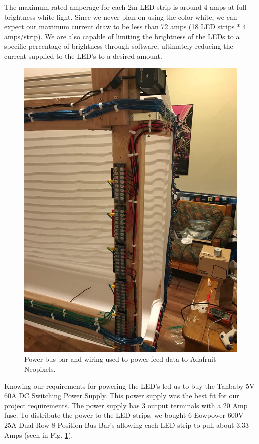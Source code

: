 \documentclass[11pt]{IEEEtran}
\begin{document}
The maximum rated amperage for each 2m LED strip is around 4 amps at full brightness white light. Since we never plan on using the color white, we can expect our maximum current draw to be less than 72 amps (18 LED strips * 4 amps/strip). We are also capable of limiting the brightness of the LEDs to a specific percentage of brightness through software, ultimately reducing the current supplied to the LED’s to a desired amount.

\begin{figure}[H]
  \centering
  \includegraphics[width=\columnwidth]{wiring.jpg}
  \caption{Power bus bar and wiring used to power feed data to Adafruit Neopixels.}
  \label{fig:wiring}
\end{figure}

Knowing our requirements for powering the LED’s led us to buy the Tanbaby 5V 60A DC Switching Power Supply. This power supply was the best fit for our project requirements. The power supply has 3 output terminals with a 20 Amp fuse. To distribute the power to the LED strips, we bought 6 Eowpower 600V 25A Dual Row 8 Position Bus Bar’s allowing each LED strip to pull about 3.33 Amps (seen in Fig. \ref{fig:wiring}).
\end{document}
